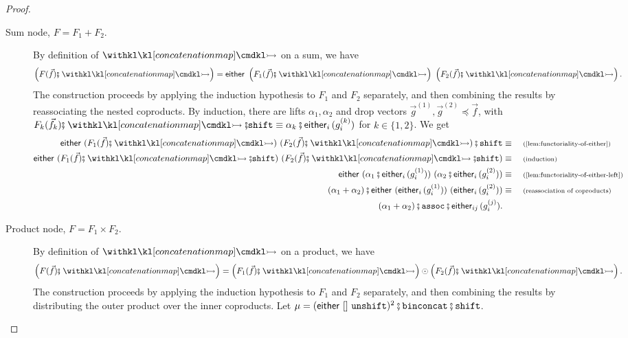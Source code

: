 \begin{proof}
\begin{description}
        \item[Sum node, $F = F_1 + F_2$.] By definition of $\concmap$ on a sum, we have
        \[
            \left( F(\vec f) \comp \concmap \right) = \either{\left(F_1(\vec f) \comp \concmap \right)}{\left(F_2(\vec f) \comp \concmap \right)}.
        \]
        The construction proceeds by applying the induction hypothesis to $F_1$ and $F_2$ separately, and then combining the results by reassociating the nested coproducts. By induction, there are lifts $\alpha_1, \alpha_2$ and drop vectors $\vec g^{(1)}, \vec g^{(2)} \preceq \vec f$, with $F_k(\vec f_k) \comp \concmap \comp \shiftterm \equiv \alpha_k \comp \eithermany{i}{(g_i^{(k)})}$ for $k \in \{1, 2\}$. We get 
        \begin{align*}
            \either{(F_1(\vec f) \comp \concmap)}{(F_2(\vec f) \comp \concmap)} \comp \shiftterm \equalbecause{\cref{lem:functoriality-of-either}} \\
            \either{(F_1(\vec f) \comp \concmap \comp \shiftterm)}{(F_2(\vec f) \comp \concmap \comp \shiftterm)} \equalbecause{induction} \\
            \either{(\alpha_1 \comp \eithermany{i}{(g_i^{(1)})})}{(\alpha_2 \comp \eithermany{i}{(g_i^{(2)})})} \equalbecause{\cref{lem:functoriality-of-either-left}} \\ 
            (\alpha_1 + \alpha_2) \comp \either{(\eithermany{i}{(g_i^{(1)})})}{(\eithermany{i}{(g_i^{(2)})})} \equalbecause{reassociation of coproducts} \\
            (\alpha_1 + \alpha_2) \comp \assoc \comp \eithermany{i j}{(g^{(j)}_i)}.
        \end{align*}

        \item[Product node, $F = F_1 \times F_2$.] By definition of $\concmap$ on a product, we have
        \[
            \left( F(\vec f) \comp \concmap \right) = \left( F_1(\vec f) \comp \concmap \right) \odot \left( F_2(\vec f) \comp \concmap \right).
        \]
        The construction proceeds by applying the induction hypothesis to $F_1$ and $F_2$ separately, and then combining the results by distributing the outer product over the inner coproducts. Let $\mu = (\either{[]}{\unshiftterm})^2 \comp \binconcatterm \comp \shiftterm$.
        

\end{description}
\end{proof}
